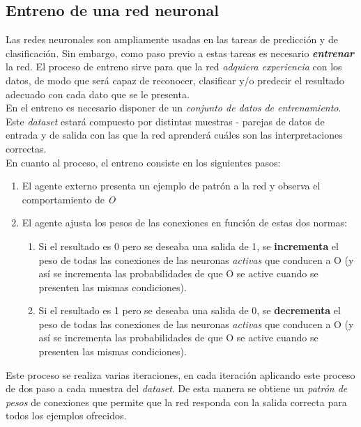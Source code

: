 \subsection{Entreno de una red neuronal}

Las redes neuronales son ampliamente usadas en las tareas de predicción y de clasificación. Sin embargo, como paso previo a estas tareas es necesario \textit{\textbf{entrenar}} la red. El proceso de entreno sirve para que la red \textit{adquiera experiencia} con los datos, de modo que será capaz de reconocer, clasificar y/o predecir el resultado adecuado con cada dato que se le presenta. \\

En el entreno es necesario disponer de un \textit{conjunto de datos de entrenamiento}. Este \textit{dataset} estará compuesto por distintas muestras - parejas de datos de entrada y de salida con las que la red aprenderá cuáles son las interpretaciones correctas. \\

En cuanto al proceso, el entreno consiste en los siguientes pasos: 
\begin{enumerate}
    \item El agente externo presenta un ejemplo de patrón a la red y observa el comportamiento de \textit{O}
    \item El agente ajusta los pesos de las conexiones en función de estas dos normas:
        \begin{enumerate}
        \item Si el resultado es 0 pero se deseaba una salida de 1, se \textbf{incrementa} el peso de todas las conexiones de las neuronas \textit{activas} que conducen a O (y así se incrementa las probabilidades de que O se active cuando se presenten las mismas condiciones).
        \item Si el resultado es 1 pero se deseaba una salida de 0, se \textbf{decrementa} el peso de todas las conexiones de las neuronas \textit{activas} que conducen a O (y así se incrementa las probabilidades de que O se active cuando se presenten las mismas condiciones).
    \end{enumerate}
\end{enumerate}

Este proceso se realiza varias iteraciones, en cada iteración aplicando este proceso de dos paso a cada muestra del \textit{dataset}. De esta manera se obtiene un \textit{patrón de pesos} de conexiones que permite que la red responda con la salida correcta para todos los ejemplos ofrecidos. \\